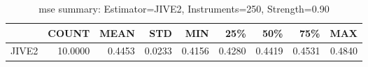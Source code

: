 \begin{table}[ht]
\centering
\caption{mse summary: Estimator=JIVE2, Instruments=250, Strength=0.90}
\begin{tabular}{lrrrrrrrr}
\toprule
 & COUNT & MEAN & STD & MIN & 25\% & 50\% & 75\% & MAX \\
\midrule
JIVE2 & 10.0000 & 0.4453 & 0.0233 & 0.4156 & 0.4280 & 0.4419 & 0.4531 & 0.4840 \\
\bottomrule
\end{tabular}
\end{table}
